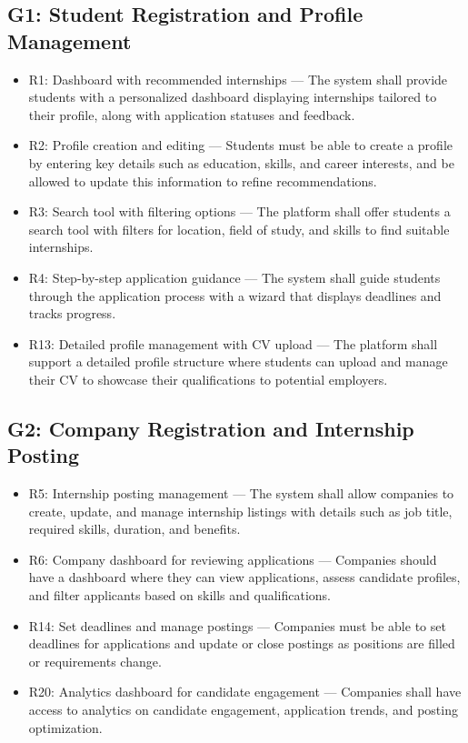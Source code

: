 \subsection{G1: Student Registration and Profile Management}
\begin{itemize}
    \item R1: Dashboard with recommended internships — The system shall provide students with a personalized dashboard displaying internships tailored to their profile, along with application statuses and feedback.
    \item R2: Profile creation and editing — Students must be able to create a profile by entering key details such as education, skills, and career interests, and be allowed to update this information to refine recommendations.
    \item R3: Search tool with filtering options — The platform shall offer students a search tool with filters for location, field of study, and skills to find suitable internships.
    \item R4: Step-by-step application guidance — The system shall guide students through the application process with a wizard that displays deadlines and tracks progress.
    \item R13: Detailed profile management with CV upload — The platform shall support a detailed profile structure where students can upload and manage their CV to showcase their qualifications to potential employers.
\end{itemize}

\subsection{G2: Company Registration and Internship Posting}
\begin{itemize}
    \item R5: Internship posting management — The system shall allow companies to create, update, and manage internship listings with details such as job title, required skills, duration, and benefits.
    \item R6: Company dashboard for reviewing applications — Companies should have a dashboard where they can view applications, assess candidate profiles, and filter applicants based on skills and qualifications.
    \item R14: Set deadlines and manage postings — Companies must be able to set deadlines for applications and update or close postings as positions are filled or requirements change.
    \item R20: Analytics dashboard for candidate engagement — Companies shall have access to analytics on candidate engagement, application trends, and posting optimization.
\end{itemize}

